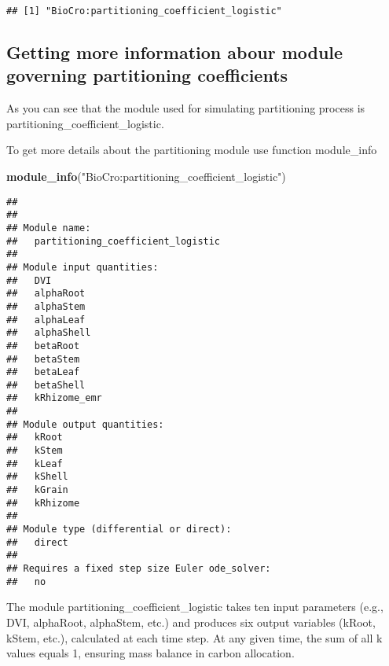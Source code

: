 \documentclass[
]{article}
\newenvironment{Shaded}{\begin{snugshade}}{\end{snugshade}}
\newcommand{\CommentTok}[1]{\textcolor[rgb]{0.56,0.35,0.01}{\textit{#1}}}
\newcommand{\FunctionTok}[1]{\textcolor[rgb]{0.13,0.29,0.53}{\textbf{#1}}}
\newcommand{\NormalTok}[1]{#1}
\newcommand{\SpecialCharTok}[1]{\textcolor[rgb]{0.81,0.36,0.00}{\textbf{#1}}}
\newcommand{\StringTok}[1]{\textcolor[rgb]{0.31,0.60,0.02}{#1}}
\begin{document}
\begin{Shaded}
\end{Shaded}

\begin{verbatim}
## [1] "BioCro:partitioning_coefficient_logistic"
\end{verbatim}

\subsection{Getting more information abour module governing partitioning
coefficients}\label{getting-more-information-abour-module-governing-partitioning-coefficients}

As you can see that the module used for simulating partitioning process
is partitioning\_coefficient\_logistic.

To get more details about the partitioning module use function
module\_info

\begin{Shaded}
\begin{Highlighting}[]
\FunctionTok{module\_info}\NormalTok{(}\StringTok{"BioCro:partitioning\_coefficient\_logistic"}\NormalTok{)}
\end{Highlighting}
\end{Shaded}

\begin{verbatim}
## 
## 
## Module name:
##   partitioning_coefficient_logistic
## 
## Module input quantities:
##   DVI
##   alphaRoot
##   alphaStem
##   alphaLeaf
##   alphaShell
##   betaRoot
##   betaStem
##   betaLeaf
##   betaShell
##   kRhizome_emr
## 
## Module output quantities:
##   kRoot
##   kStem
##   kLeaf
##   kShell
##   kGrain
##   kRhizome
## 
## Module type (differential or direct):
##   direct
## 
## Requires a fixed step size Euler ode_solver:
##   no
\end{verbatim}

The module partitioning\_coefficient\_logistic takes ten input
parameters (e.g., DVI, alphaRoot, alphaStem, etc.) and produces six
output variables (kRoot, kStem, etc.), calculated at each time step. At
any given time, the sum of all k values equals 1, ensuring mass balance
in carbon allocation.
\end{document}
